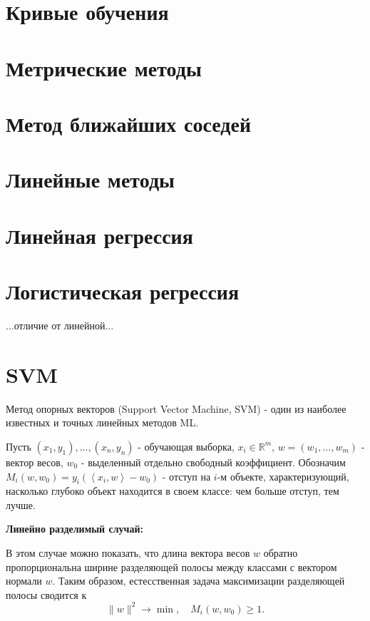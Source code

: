 \section{Кривые обучения}


\section{Метрические методы}


\section{Метод ближайших соседей}


\section{Линейные методы}


\section{Линейная регрессия}


\section{Логистическая регрессия}

...отличие от линейной...


\section{SVM}

Метод опорных векторов (Support Vector Machine, SVM) - один из наиболее известных и точных линейных методов ML.

Пусть $(x_1, y_1), ..., (x_n, y_n)$ - обучающая выборка, $x_i \in \mathbb{R}^m$, $w = (w_1, ..., w_m)$ - вектор весов, $w_0$ - выделенный отдельно свободный коэффициент.
Обозначим $M_i(w, w_0) = y_i\left(\left<x_i, w\right> - w_0\right)$ - отступ на $i$-м объекте, характеризующий, насколько глубоко объект находится в своем классе: чем больше отступ, тем лучше.

\textbf{Линейно разделимый случай:}

В этом случае можно показать, что длина вектора весов $w$ обратно пропорциональна ширине разделяющей полосы между классами с вектором нормали $w$. Таким образом, естесственная задача максимизации разделяющей полосы сводится к
$$
\|w\|^2 \rightarrow \min, \quad M_i(w, w_0) \geqslant 1.
$$

